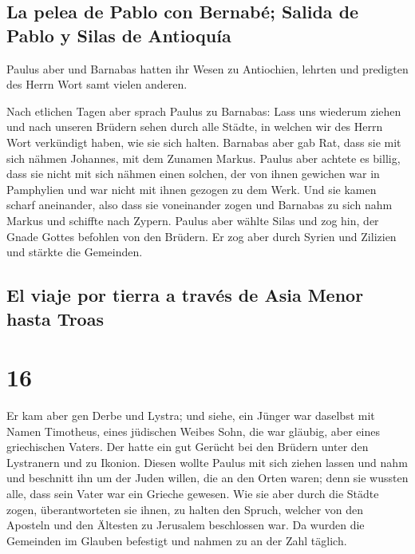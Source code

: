\hypertarget{la-pelea-de-pablo-con-bernabuxe9-salida-de-pablo-y-silas-de-antioquuxeda}{%
\subsection{La pelea de Pablo con Bernabé; Salida de Pablo y Silas de
Antioquía}\label{la-pelea-de-pablo-con-bernabuxe9-salida-de-pablo-y-silas-de-antioquuxeda}}

 Paulus aber und Barnabas hatten ihr Wesen zu Antiochien,
lehrten und predigten des Herrn Wort samt vielen anderen.

 Nach etlichen Tagen aber sprach Paulus zu Barnabas: Lass
uns wiederum ziehen und nach unseren Brüdern sehen durch alle Städte, in
welchen wir des Herrn Wort verkündigt haben, wie sie sich halten.
 Barnabas aber gab Rat, dass sie mit sich nähmen
Johannes, mit dem Zunamen Markus.  Paulus aber achtete es
billig, dass sie nicht mit sich nähmen einen solchen, der von ihnen
gewichen war in Pamphylien und war nicht mit ihnen gezogen zu dem Werk.
 Und sie kamen scharf aneinander, also dass sie
voneinander zogen und Barnabas zu sich nahm Markus und schiffte nach
Zypern.  Paulus aber wählte Silas und zog hin, der Gnade
Gottes befohlen von den Brüdern.  Er zog aber durch
Syrien und Zilizien und stärkte die Gemeinden.

\hypertarget{el-viaje-por-tierra-a-travuxe9s-de-asia-menor-hasta-troas}{%
\subsection{El viaje por tierra a través de Asia Menor hasta
Troas}\label{el-viaje-por-tierra-a-travuxe9s-de-asia-menor-hasta-troas}}

\hypertarget{section-15}{%
\section{16}\label{section-15}}

 Er kam aber gen Derbe und Lystra; und siehe, ein Jünger
war daselbst mit Namen Timotheus, eines jüdischen Weibes Sohn, die war
gläubig, aber eines griechischen Vaters.  Der hatte ein
gut Gerücht bei den Brüdern unter den Lystranern und zu Ikonion.
 Diesen wollte Paulus mit sich ziehen lassen und nahm und
beschnitt ihn um der Juden willen, die an den Orten waren; denn sie
wussten alle, dass sein Vater war ein Grieche gewesen. 
Wie sie aber durch die Städte zogen, überantworteten sie ihnen, zu
halten den Spruch, welcher von den Aposteln und den Ältesten zu
Jerusalem beschlossen war.  Da wurden die Gemeinden im
Glauben befestigt und nahmen zu an der Zahl täglich.

